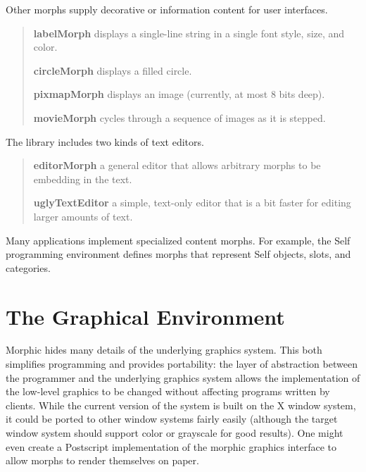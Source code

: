 \documentclass[letterpaper,10pt,english]{sphinxmanual}
\begin{document}
Other morphs supply decorative or information content for user interfaces.
\begin{quote}

\textbf{labelMorph} displays a single-line string in a single font style, size, and color.

\textbf{circleMorph} displays a filled circle.

\textbf{pixmapMorph} displays an image (currently, at most 8 bits deep).

\textbf{movieMorph} cycles through a sequence of images as it is stepped.
\end{quote}

The library includes two kinds of text editors.
\begin{quote}

\textbf{editorMorph} a general editor that allows arbitrary morphs to be embedding in the text.

\textbf{uglyTextEditor} a simple, text-only editor that is a bit faster for editing larger amounts of text.
\end{quote}

Many applications implement specialized content morphs. For example, the Self programming environment defines morphs that represent Self objects, slots, and categories.


\section{The Graphical Environment}
\label{morphic:the-graphical-environment}
Morphic hides many details of the underlying graphics system. This both simplifies programming and provides portability: the layer of abstraction between the programmer and the underlying graphics system allows the implementation of the low-level graphics to be changed without affecting programs written by clients. While the current version of the system is built on the X window system, it could be ported to other window systems fairly easily (although the target window system should support color or grayscale for good results). One might even create a Postscript implementation of the morphic graphics interface to allow morphs to render themselves on paper.
\end{document}
